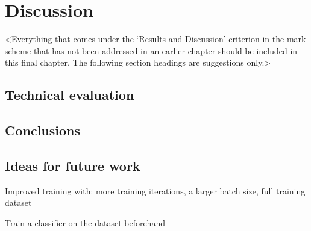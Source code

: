 \chapter{Discussion}
\label{chapter4}

<Everything that comes under the `Results and Discussion' criterion in the mark scheme that has not been addressed in an earlier chapter should be included in this final chapter. The following section headings are suggestions only.>

\section{Technical evaluation}

\section{Conclusions}

\section{Ideas for future work}
Improved training with: more training iterations, a larger batch size, full training dataset

Train a classifier on the dataset beforehand
